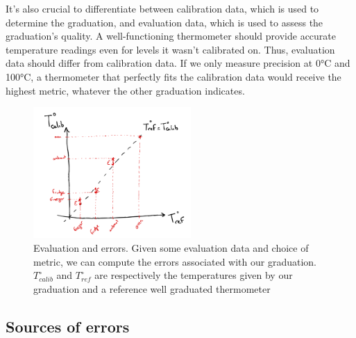 \begin{bibunit}
It's also crucial to differentiate between calibration data, which is used to determine the graduation, and evaluation data, which is used to assess the graduation's quality.
A well-functioning thermometer should provide accurate temperature readings even for levels it wasn't calibrated on. Thus, evaluation data should differ from calibration data.
If we only measure precision at 0°C and 100°C, a thermometer that perfectly fits the calibration data would receive the highest metric, whatever the other graduation indicates.

\begin{figure}
\includegraphics[clip, width=6cm]{Introduction/pics/errors.png}  
    \centering
    \caption{Evaluation and errors. Given some evaluation data and choice of metric, we can compute the errors associated with our graduation. $T^{\circ}_{calib}$ and $T^{\circ}_{ref}$ are respectively the temperatures given by our graduation and a reference well graduated thermometer}
    \label{fig:err_sources}
\end{figure}



 \subsection{Sources of errors}



\end{bibunit}
